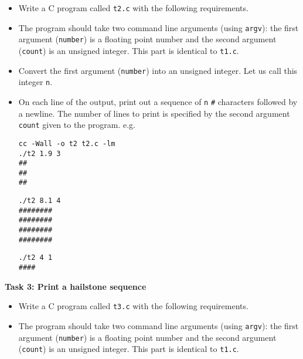 \documentclass[11pt]{article}
\begin{document}
\begin{exe}
\begin{itemize}
\item Write a C program called \texttt{t2.c} with the following requirements.

\item The program should take two command line arguments (using \texttt{argv}): 
the first argument (\texttt{number}) is a floating point number and
the second argument (\texttt{count}) is an unsigned integer. This
part is identical to \texttt{t1.c}.

\item Convert the first argument (\texttt{number}) into an unsigned
integer. Let us call this integer \texttt{n}.

\item On each line of the output, print out a sequence of \texttt{n}
\texttt{\#} characters followed by a newline.  The number of lines
to print is specified by the second argument \texttt{count} given
to the program. e.g.

\footnotesize
\smallskip
\begin{minipage}{2in}
\begin{verbatim}
cc -Wall -o t2 t2.c -lm
./t2 1.9 3
##
##
##
\end{verbatim}
\end{minipage}
\begin{minipage}{2in}
\begin{verbatim}
./t2 8.1 4
########
########
########
########
\end{verbatim}
\end{minipage}
\begin{minipage}{2in}
\begin{verbatim}
./t2 4 1
####
\end{verbatim}
\end{minipage}

\end{itemize}
\normalsize

\ex \textbf{Task 3: Print a hailstone sequence}

\begin{itemize}\addtolength{\itemsep}{-0.3\baselineskip}

\item Write a C program called \texttt{t3.c} with the following
requirements.

\item The program should take two command line arguments (using
\texttt{argv}): the first argument (\texttt{number}) is a floating
point number and the second argument (\texttt{count}) is an unsigned
integer. This part is identical to \texttt{t1.c}.


\end{itemize}
\end{exe}
\end{document}

